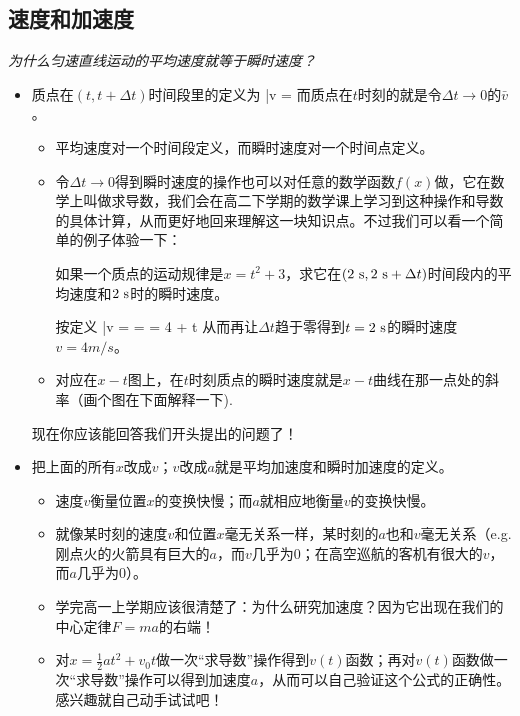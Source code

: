 \documentclass[a4paper,9pt]{ctexart}
\begin{document}
\subsection{速度和加速度}
\emph{为什么匀速直线运动的平均速度就等于瞬时速度？}
\begin{itemize}
\item
质点在$(t,t+\Delta t)$时间段里的定义为
\beq
\bar v = 
\eeq
而质点在$t$时刻的就是令$\Delta t \to 0$的$\bar v$。
\begin{itemize}
\item
平均速度对一个时间段定义，而瞬时速度对一个时间点定义。
\item
令$\Delta t \to 0$得到瞬时速度的操作也可以对任意的数学函数$f(x)$做，它在数学上叫做求导数，我们会在高二下学期的数学课上学习到这种操作和导数的具体计算，从而更好地回来理解这一块知识点。不过我们可以看一个简单的例子体验一下：
\begin{eg}
如果一个质点的运动规律是$x = t^2 + 3$，求它在$(2{\rm \ s},2{\rm \ s} + \Delta t)$时间段内的平均速度和$2{\rm \ s}$时的瞬时速度。
\end{eg}
\begin{ans}
按定义
\beq
\bar v =  =  = 4 + \Delta t
\eeq
从而再让$\Delta t$趋于零得到$t=2{\rm \ s}$的瞬时速度$v = 4\unit{m/s}$。
\end{ans}
\item
对应在$x-t$图上，在$t$时刻质点的瞬时速度就是$x-t$曲线在那一点处的斜率（画个图在下面解释一下).
\vspace{5cm}
\end{itemize}
现在你应该能回答我们开头提出的问题了！
\vspace{5cm}
\item
把上面的所有$x$改成$v$；$v$改成$a$就是平均加速度和瞬时加速度的定义。
\begin{itemize}
\item
速度$v$衡量位置$x$的变换快慢；而$a$就相应地衡量$v$的变换快慢。
\item
就像某时刻的速度$v$和位置$x$毫无关系一样，某时刻的$a$也和$v$毫无关系（e.g. 刚点火的火箭具有巨大的$a$，而$v$几乎为0；在高空巡航的客机有很大的$v$，而$a$几乎为0）。
\item
学完高一上学期应该很清楚了：为什么研究加速度？因为它出现在我们的中心定律$F=ma$的右端！
\item
对$x = \frac{1}{2}at^2 + v_0 t$做一次“求导数”操作得到$v(t)$函数；再对$v(t)$函数做一次“求导数”操作可以得到加速度$a$，从而可以自己验证这个公式的正确性。感兴趣就自己动手试试吧！

\end{itemize}
\end{itemize}
\end{document}
